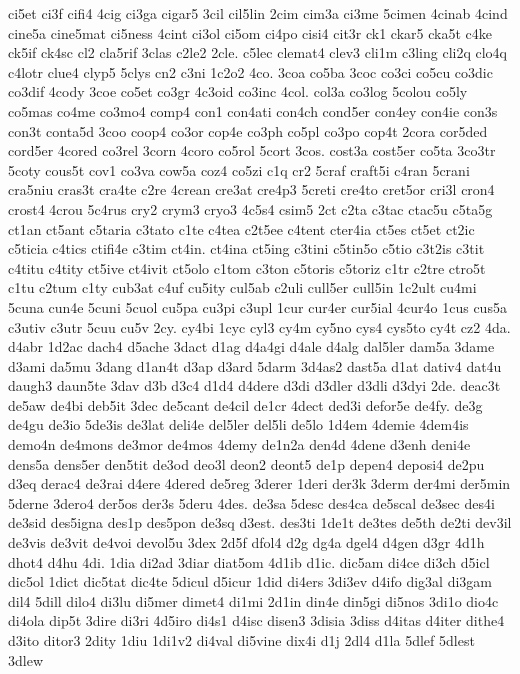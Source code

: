 {ci5et
ci3f
cifi4
4cig
ci3ga
cigar5
3cil
cil5lin
2cim
cim3a
ci3me
5cimen
4cinab
4cind
cine5a
cine5mat
ci5ness
4cint
ci3ol
ci5om
ci4po
cisi4
cit3r
ck1
ckar5
cka5t
c4ke
ck5if
ck4sc
cl2
cla5rif
3clas
c2le2
2cle.
c5lec
clemat4
clev3
cli1m
c3ling
cli2q
clo4q
c4lotr
clue4
clyp5
5clys
cn2
c3ni
1c2o2
4co.
3coa
co5ba
3coc
co3ci
co5cu
co3dic
co3dif
4cody
3coe
co5et
co3gr
4c3oid
co3inc
4col.
col3a
co3log
5colou
co5ly
co5mas
co4me
co3mo4
comp4
con1
con4ati
con4ch
cond5er
con4ey
con4ie
con3s
con3t
conta5d
3coo
coop4
co3or
cop4e
co3ph
co5pl
co3po
cop4t
2cora
cor5ded
cord5er
4cored
co3rel
3corn
4coro
co5rol
5cort
3cos.
cost3a
cost5er
co5ta
3co3tr
5coty
cous5t
cov1
co3va
cow5a
coz4
co5zi
c1q
cr2
5craf
craft5i
c4ran
5crani
cra5niu
cras3t
cra4te
c2re
4crean
cre3at
cre4p3
5creti
cre4to
cret5or
cri3l
cron4
crost4
4crou
5c4rus
cry2
crym3
cryo3
4c5s4
csim5
2ct
c2ta
c3tac
ctac5u
c5ta5g
ct1an
ct5ant
c5taria
c3tato
c1te
c4tea
c2t5ee
c4tent
cter4ia
ct5es
ct5et
ct2ic
c5ticia
c4tics
ctifi4e
c3tim
ct4in.
ct4ina
ct5ing
c3tini
c5tin5o
c5tio
c3t2is
c3tit
c4titu
c4tity
ct5ive
ct4ivit
ct5olo
c1tom
c3ton
c5toris
c5toriz
c1tr
c2tre
ctro5t
c1tu
c2tum
c1ty
cub3at
c4uf
cu5ity
cul5ab
c2uli
cull5er
cull5in
1c2ult
cu4mi
5cuna
cun4e
5cuni
5cuol
cu5pa
cu3pi
c3upl
1cur
cur4er
cur5ial
4cur4o
1cus
cus5a
c3utiv
c3utr
5cuu
cu5v
2cy.
cy4bi
1cyc
cyl3
cy4m
cy5no
cys4
cys5to
cy4t
cz2
4da.
d4abr
1d2ac
dach4
d5ache
3dact
d1ag
d4a4gi
d4ale
d4alg
dal5ler
dam5a
3dame
d3ami
da5mu
3dang
d1an4t
d3ap
d3ard
5darm
3d4as2
dast5a
d1at
dativ4
dat4u
daugh3
daun5te
3dav
d3b
d3c4
d1d4
d4dere
d3di
d3dler
d3dli
d3dyi
2de.
deac3t
de5aw
de4bi
deb5it
3dec
de5cant
de4cil
de1cr
4dect
ded3i
defor5e
de4fy.
de3g
de4gu
de3io
5de3is
de3lat
deli4e
del5ler
del5li
de5lo
1d4em
4demie
4dem4is
demo4n
de4mons
de3mor
de4mos
4demy
de1n2a
den4d
4dene
d3enh
deni4e
dens5a
dens5er
den5tit
de3od
deo3l
deon2
deont5
de1p
depen4
deposi4
de2pu
d3eq
derac4
de3rai
d4ere
4dered
de5reg
3derer
1deri
der3k
3derm
der4mi
der5min
5derne
3dero4
der5os
der3s
5deru
4des.
de3sa
5desc
des4ca
de5scal
de3sec
des4i
de3sid
des5igna
des1p
des5pon
de3sq
d3est.
des3ti
1de1t
de3tes
de5th
de2ti
dev3il
de3vis
de3vit
de4voi
devol5u
3dex
2d5f
dfol4
d2g
dg4a
dgel4
d4gen
d3gr
4d1h
dhot4
d4hu
4di.
1dia
di2ad
3diar
diat5om
4d1ib
d1ic.
dic5am
di4ce
di3ch
d5icl
dic5ol
1dict
dic5tat
dic4te
5dicul
d5icur
1did
di4ers
3di3ev
d4ifo
dig3al
di3gam
dil4
5dill
dilo4
di3lu
di5mer
dimet4
di1mi
2d1in
din4e
din5gi
di5nos
3di1o
dio4c
di4ola
dip5t
3dire
di3ri
4d5iro
di4s1
d4isc
disen3
3disia
3diss
d4itas
d4iter
dithe4
d3ito
ditor3
2dity
1diu
1di1v2
di4val
di5vine
dix4i
d1j
2dl4
d1la
5dlef
5dlest
3dlew
}
